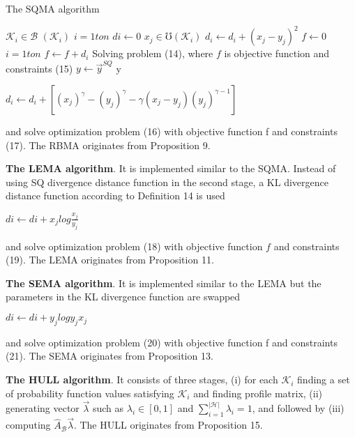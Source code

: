 \documentclass[]{iosart2c}
\begin{document}
    \begin{algorithm}
        \caption{The SQMA algorithm}
        \begin{algorithmic}[1]
            \For
                $\mathcal{K}_i \in \mathcal{B}$
                \State $(\mathcal{K}_i )$
            \EndFor
            \For
                $i=1 to n$
                \State $di \gets 0$
                \For
                    $x_j \in \mho(\mathcal{K}_i)$
                    \State $d_i \gets d_i + (x_j - y_j)^2$
                \EndFor
            \EndFor
            \State $f \gets 0$
            \For
                $i=1 to n$
                \State $f \gets f + d_i$
            \EndFor
            \State Solving problem (14), where $f$ is objective function and
            constraints (15)
            \State $y \gets \vec{y}^{SQ}$
            \State \Return y
        \end{algorithmic}
    \end{algorithm}

    $d_i \gets d_i + \left[ (x_j)^\gamma - (y_j)^\gamma - \gamma(x_j - y_j)(y_j)^{\gamma-1} \right]$

    and solve optimization problem (16) with objective function f and constraints (17). The RBMA originates from Proposition
    9.

    \textbf{The LEMA algorithm}. It is implemented similar
    to the SQMA. Instead of using SQ divergence distance
    function in the second stage, a KL divergence
    distance function according to Definition 14 is used

    $di \gets di + x_j log{\frac{x_j}{y_j}}$

    and solve optimization problem (18) with objective function $f$ and constraints (19). The LEMA originates from Proposition 11.

    \textbf{The SEMA algorithm}. It is implemented similar to the LEMA but the parameters in the KL divergence function are swapped

    $di \gets di + y_j log{{y_j}{x_j}}$

    and solve optimization problem (20) with objective function f and constraints (21). The SEMA originates from Proposition 13.

    \textbf{The HULL algorithm}. It consists of three stages, (i) for each $\mathcal{K}_i$ finding a set of probability function
    values satisfying $\mathcal{K}_i$ and finding profile matrix, (ii)
    generating vector $\vec{\lambda}$ such as $\lambda_i \in [0, 1]$ and
    $\sum^|\mathcal{H}|_{i=1} \lambda_i = 1$, and followed by (iii) computing $\hat{A}_\mathcal{B}\vec{\lambda}$. The HULL originates from Proposition 15.
\end{document}
